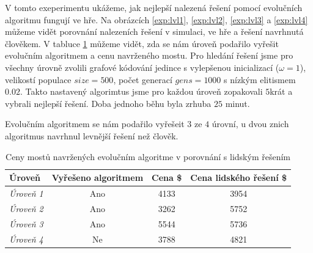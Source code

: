 V tomto exeperimentu ukážeme, jak nejlepší nalezená řešení pomocí evolučních algoritmu fungují ve hře. Na obrázcích \ref{exp:lvl1}, \ref{exp:lvl2}, \ref{exp:lvl3} a \ref{exp:lvl4} můžeme vidět porovnání nalezeních řešení v simulaci, ve hře a řešení navrhnutá člověkem. V tabluce \ref{tab:2} můžeme vidět, zda se nám úroveň podařilo vyřešit evolučním algoritmem a cenu navrženého mostu. Pro hledání řešení jsme pro všechny úrovně zvolili grafové kódování jedince s vylepšenou inicializací ($\omega=1$), velikostí populace $size=500$, počet generací $gens=1000$ s nízkým elitismem $0.02$. Takto nastavený algorimtus jsme pro každou úroveň zopakovali $5$krát a vybrali nejlepší řešení. Doba jednoho běhu byla zrhuba $25$ minut.

Evolučním algoritmem se nám podařilo vyřešeit $3$ ze $4$ úrovní, u dvou znich algoritmus navrhnul levnější řešení než člověk.

\begin{table}[b!]
\centering
\begin{tabular}{lccc}
\toprule
\textbf{Úroveň} & \textbf{Vyřešeno algoritmem} & \textbf{Cena \$} & \textbf{Cena lidského řešení \$} \\
\midrule
\emph{Úroveň 1} & Ano &  4133 & 3954 \\
\emph{Úroveň 2} & Ano &  3262 & 5752 \\
\emph{Úroveň 3} & Ano &  5544 & 5736 \\
\emph{Úroveň 4} & Ne  &  3788 & 4821 \\
\bottomrule
\end{tabular}
\caption{Ceny mostů navržených evolučním algoritme v porovnání s lidským řešením}
\label{tab:2}
\end{table}


